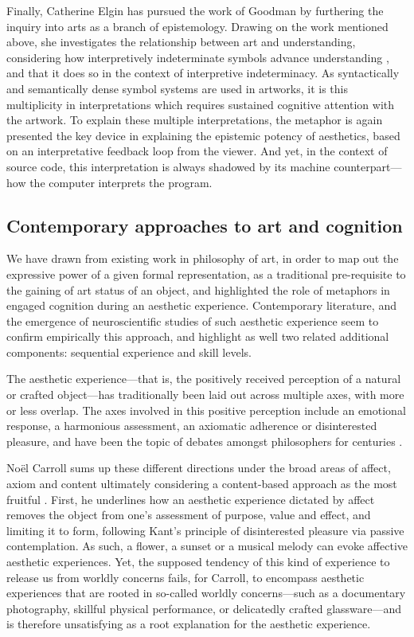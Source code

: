 Finally, Catherine Elgin has pursued the work of Goodman by furthering the inquiry into arts as a branch of epistemology. Drawing on the work mentioned above, she investigates the relationship between art and understanding, considering how interpretively indeterminate symbols advance understanding \citep{elgin_understanding_2020}, and that it does so in the context of interpretive indeterminacy. As syntactically and semantically dense symbol systems are used in artworks, it is this multiplicity in interpretations which requires sustained cognitive attention with the artwork. To explain these multiple interpretations, the metaphor is again presented the key device in explaining the epistemic potency of aesthetics, based on an interpretative feedback loop from the viewer. And yet, in the context of source code, this interpretation is always shadowed by its machine counterpart—how the computer interprets the program.

\subsection{Contemporary approaches to art and cognition}
\label{subsec:art-cognition-contemporary}

We have drawn from existing work in philosophy of art, in order to map out the expressive power of a given formal representation, as a traditional pre-requisite to the gaining of art status of an object, and highlighted the role of metaphors in engaged cognition during an aesthetic experience. Contemporary literature, and the emergence of neuroscientific studies of such aesthetic experience seem to confirm empirically this approach, and highlight as well two related additional components: sequential experience and skill levels.

The aesthetic experience—that is, the positively received perception of a natural or crafted object—has traditionally been laid out across multiple axes, with more or less overlap. The axes involved in this positive perception include an emotional response, a harmonious assessment, an axiomatic adherence or disinterested pleasure, and have been the topic of debates amongst philosophers for centuries \citep{peacocke_aesthetic_2023}.

Noël Carroll sums up these different directions under the broad areas of affect, axiom and content ultimately considering a content-based approach as the most fruitful \citep{carroll_aesthetic_2002}. First, he underlines how an aesthetic experience dictated by affect removes the object from one's assessment of purpose, value and effect, and limiting it to form, following Kant's principle of disinterested pleasure via passive contemplation. As such, a flower, a sunset or a musical melody can evoke affective aesthetic experiences. Yet, the supposed tendency of this kind of experience to release us from worldly concerns fails, for Carroll, to encompass aesthetic experiences that are rooted in so-called worldly concerns—such as a documentary photography, skillful physical performance, or delicatedly crafted glassware—and is therefore unsatisfying as a root explanation for the aesthetic experience.

